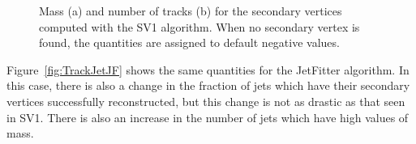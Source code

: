 \begin{figure}[h!]
   \caption{Mass (a) and number of tracks (b) for the secondary vertices computed with the SV1 algorithm. When no secondary vertex is found, the quantities are assigned to default negative values.}
  \label{fig:TrackJetSV1}
\end{figure}

Figure~\ref{fig:TrackJetJF} shows the same quantities for the JetFitter algorithm. In this case, there is also a change in the fraction of jets which have their secondary vertices successfully reconstructed, but this change is not as drastic as that seen in SV1. There is also an increase in the number of jets which have high values of mass. 

\begin{figure}[h!]
  \centering
  \captionsetup{justification=centering}


\end{figure}
